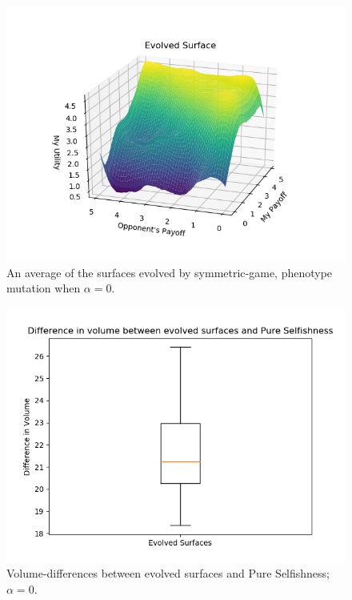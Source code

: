 \documentclass[11pt]{book}
\begin{document}
\begin{figure}
	\centering
	\includegraphics[scale=0.7]{resources/average_r_0_symmetric_evolved.png}
	\caption{An average of the surfaces evolved by symmetric-game, phenotype mutation when $\alpha = 0$.}
	\label{average_r_0_symmetric_evolved}
\end{figure}

\begin{figure}
	\centering
	\includegraphics[scale=0.7]{resources/boxplot_volume_difference_symmetric_r_0.png}
	\caption{Volume-differences between evolved surfaces and Pure Selfishness; $\alpha = 0$.}
	\label{boxplot_volume_difference_symmetric_r_0}
\end{figure}
\end{document}
